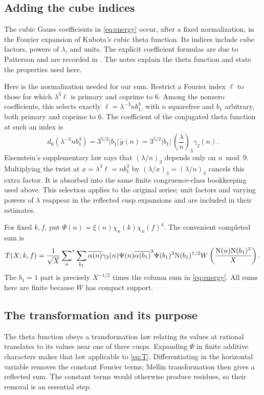 \documentclass[11pt]{article}
\newcommand{\N}{\mathrm N}
\newcommand{\starred}{\sideset{}{^*}\sum}
\numberwithin{equation}{section}
\begin{document}
\subsection{Adding the cube indices}
The cubic Gauss coefficients in \eqref{eq:energy} occur, after a fixed
normalization, in the Fourier expansion of Kubota's cubic theta function.
Its indices include cube factors, powers of $\lambda$, and units.
The explicit coefficient formulas are due to Patterson and are recorded
in \cite[Section 5.1 and Appendix]{DR}. The notes \cite[Section~5]{QF} explain the theta
function and state the properties used here.

Here is the normalization needed for our sum. Restrict a Fourier index
$\ell$ to those for which $\lambda^3\ell$ is primary and coprime to $6$.
Among the nonzero coefficients, this selects exactly
$\ell=\lambda^{-3}nb_1^3$, with $n$ squarefree and $b_1$ arbitrary,
both primary and coprime to $6$. The coefficient of the conjugated theta
function at such an index is
\begin{equation}\label{eq:thetacoef}
 d_0(\lambda^{-3}nb_1^3)
 =3^{5/2}|b_1|\,\widetilde g(n)
 =3^{5/2}|b_1|\,\overline{\left(\frac\lambda n\right)_3}\gamma_2(n).
\end{equation}
Eisenstein's supplementary law says that $(\lambda/n)_3$ depends only
on $n\bmod9$. Multiplying the twist at $x=\lambda^3\ell=nb_1^3$ by
$(\lambda/x)_3=(\lambda/n)_3$ cancels this extra factor. It is absorbed
into the same finite congruence-class bookkeeping used above.
This selection applies to the original series; unit factors and varying
powers of $\lambda$ reappear in the reflected cusp expansions and are
included in their estimates.

For fixed $k,f$, put
$\Psi(n)=\xi(n)\chi_n(k)\chi_n(f)^4$. The convenient completed sum is
\begin{equation}\label{eq:T}
 T(X;k,f)=\frac1{\sqrt X}\starred_n\sum_{b_1}
 \overline{\alpha(n)}\gamma_2(n)\Psi(n)
 \overline{\alpha(b_1)}^3\Psi(b_1)^3\N(b_1)^{1/2}
 W\left(\frac{\N(n)\N(b_1)^3}X\right).
\end{equation}
The $b_1=1$ part is precisely $X^{-1/2}$ times the column sum in
\eqref{eq:energy}. All sums here are finite because $W$ has compact support.

\subsection{The transformation and its purpose}
The theta function obeys a transformation law relating its values at
rational translates to its values near one of three cusps. Expanding
$\Psi$ in finite additive characters makes that law applicable to
\eqref{eq:T}. Differentiating in the horizontal variable removes the
constant Fourier terms; Mellin transformation then gives a reflected sum.
The constant terms would otherwise produce residues, so their removal
is an essential step.
\end{document}
